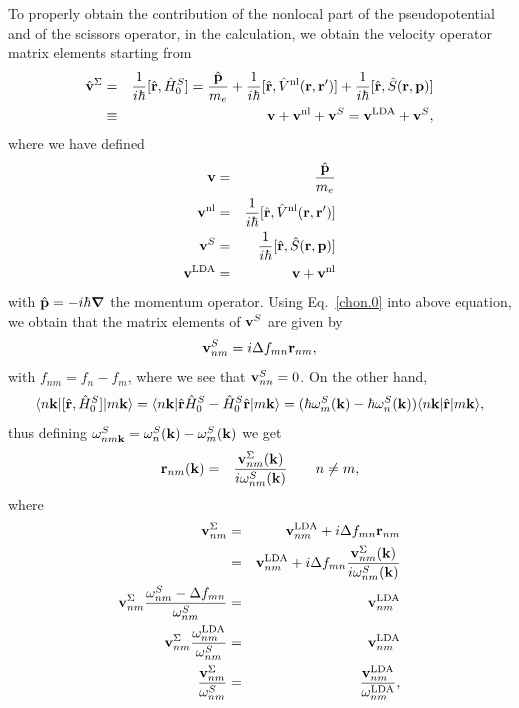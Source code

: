 \documentclass{article}
\begin{document}
To properly obtain the contribution of the nonlocal part of the
pseudopotential and of the scissors operator, 
in the calculation, we obtain
the velocity operator matrix elements starting from
\begin{eqnarray}\label{vop}
\hat{\mathbf{v}}^\Sigma&=&
\frac{1}{i\hbar}[\hat{\mathbf{r}},\hat{H}^S_0]
=\frac{\hat{\mathbf{p}}}{m_e}
+
\frac{1}{i\hbar}[\hat{\mathbf{r}},\hat V^{\mathrm{nl}}(\mathbf{r},\mathbf{r}')]
+
\frac{1}{i\hbar}[\hat{\mathbf{r}},\hat S(\mathbf{r},\mathbf{p})]
\nonumber\\
&\equiv&
\mathbf{v}
+
\mathbf{v}^{\mathrm{nl}}
+\mathbf{v}^S
=
\mathbf{v}^{\mathrm{LDA}}
+\mathbf{v}^S
,
\end{eqnarray}
where we have defined
\begin{eqnarray}\label{conhr}
\mathbf{v}
&=&\frac{\hat{\mathbf{p}}}{m_e}
\nonumber\\
\mathbf{v}^{\mathrm{nl}}
&=&
\frac{1}{i\hbar}[\hat{\mathbf{r}},\hat V^{\mathrm{nl}}(\mathbf{r},\mathbf{r}')]
\nonumber\\
\mathbf{v}^S
&=&
\frac{1}{i\hbar}[\hat{\mathbf{r}},\hat S(\mathbf{r},\mathbf{p})]
\nonumber\\
\mathbf{v}^{\mathrm{LDA}}
&=&
\mathbf{v}
+\mathbf{v}^{\mathrm{nl}}
\end{eqnarray}  
with $\hat{\mathbf{p}}=-i\hbar\boldsymbol{\nabla}$ the momentum operator.
Using Eq.~\eqref{chon.0} into above equation, we obtain that the
matrix elements of $\mathbf{v}^S$ are given by
\begin{equation}\label{chon.2} 
\mathbf{v}^S_{nm}=i\Delta f_{mn}\mathbf{r}_{nm},
\end{equation}
with $f_{nm}=f_n-f_m$,
where we see that $\mathbf{v}^S_{nn}=0$.
On the other hand,
\begin{equation}\label{conhrnm}
\langle n\mathbf{k} |
[\hat{\mathbf{r}},\hat{H}^S_0]
| m\mathbf{k} \rangle=\langle n\mathbf{k} |\hat{\mathbf{r}}\hat{H}^S_0-\hat{H}^S_0\hat{\mathbf{r}}| m\mathbf{k} \rangle
=(\hbar\omega^S_m(\mathbf{k})-\hbar\omega^S_n(\mathbf{k}))\langle n\mathbf{k} |\hat{\mathbf{r}}| m\mathbf{k} \rangle
,
\end{equation}
thus defining $\omega^S_{nm\mathbf{k}}=\omega^S_n(\mathbf{k})-\omega^S_m(\mathbf{k})$ we get
\begin{eqnarray}\label{pmnrmn}
\mathbf{r}_{nm}(\mathbf{k})
&=&
\frac{\mathbf{v}^\Sigma_{nm}(\mathbf{k})}{i\omega^S_{nm}(\mathbf{k})}
\quad\quad n\ne m
,
\end{eqnarray} 
where
\begin{eqnarray}\label{chon.8}
\mathbf{v}^\Sigma_{nm}
&=&
\mathbf{v}^{\mathrm{LDA}}_{nm}+i\Delta f_{mn}\mathbf{r}_{nm}
\nonumber\\
&=&
\mathbf{v}^{\mathrm{LDA}}_{nm}+i\Delta f_{mn}\frac{\mathbf{v}^\Sigma_{nm}(\mathbf{k})}{i\omega^S_{nm}(\mathbf{k})}
\nonumber\\
\mathbf{v}^\Sigma_{nm}
\frac{\omega^S_{nm}-\Delta f_{mn}}{\omega^S_{nm}}
&=&
\mathbf{v}^{\mathrm{LDA}}_{nm}
\nonumber\\
\mathbf{v}^\Sigma_{nm}
\frac{\omega^{\mathrm{LDA}}_{nm}}{\omega^S_{nm}}
&=&
\mathbf{v}^{\mathrm{LDA}}_{nm}
\nonumber\\
\frac{\mathbf{v}^\Sigma_{nm}}{\omega^S_{nm}}
&=&
\frac{\mathbf{v}^{\mathrm{LDA}}_{nm}}{\omega^{\mathrm{LDA}}_{nm}}
,
\end{eqnarray}
\end{document}

